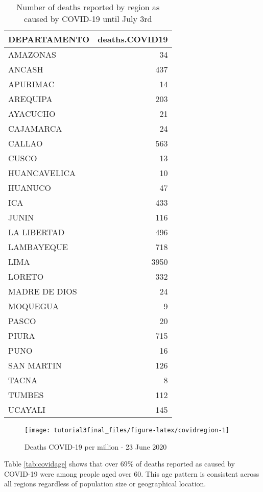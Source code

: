 \documentclass[
]{article}
\begin{document}
\begin{table}[!h]

\caption{\label{tab:countcovid}Number of deaths reported by region as caused by COVID-19 until July 3rd}
\centering
\begin{tabular}[t]{lr}
\toprule
DEPARTAMENTO & deaths.COVID19\\
\midrule
AMAZONAS & 34\\
ANCASH & 437\\
APURIMAC & 14\\
AREQUIPA & 203\\
AYACUCHO & 21\\
\addlinespace
CAJAMARCA & 24\\
CALLAO & 563\\
CUSCO & 13\\
HUANCAVELICA & 10\\
HUANUCO & 47\\
\addlinespace
ICA & 433\\
JUNIN & 116\\
LA LIBERTAD & 496\\
LAMBAYEQUE & 718\\
LIMA & 3950\\
\addlinespace
LORETO & 332\\
MADRE DE DIOS & 24\\
MOQUEGUA & 9\\
PASCO & 20\\
PIURA & 715\\
\addlinespace
PUNO & 16\\
SAN MARTIN & 126\\
TACNA & 8\\
TUMBES & 112\\
UCAYALI & 145\\
\bottomrule
\end{tabular}
\end{table}

\begin{figure}[H]

{\centering \texttt{[image: tutorial3final\_files/figure-latex/covidregion-1]} 

}

\caption{Deaths COVID-19 per million - 23 June 2020}\label{fig:covidregion}
\end{figure}

Table \ref{tab:covidage} shows that over 69\% of deaths reported as caused by COVID-19 were among people aged over 60. This age pattern is consistent across all regions regardless of population size or geographical location.
\end{document}
